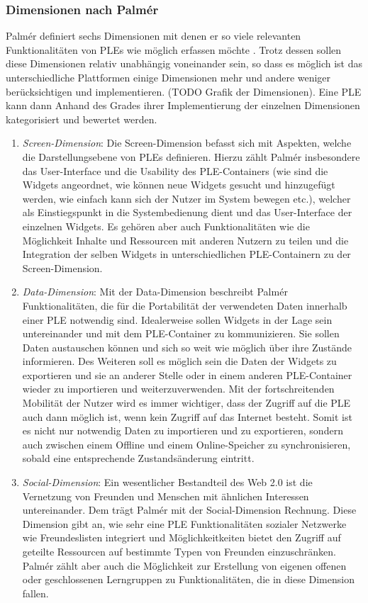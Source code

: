 \subsubsection{Dimensionen nach Palmér}\label{section:dimensions_palmer} 
Palmér definiert sechs Dimensionen mit denen er so viele relevanten Funktionalitäten von PLEs wie möglich erfassen möchte \cite{Palmer2009}. Trotz dessen sollen diese Dimensionen relativ unabhängig voneinander sein, so dass es möglich ist das unterschiedliche Plattformen einige Dimensionen mehr und andere weniger berücksichtigen und implementieren. (TODO Grafik der Dimensionen). Eine PLE kann dann Anhand des Grades ihrer Implementierung der einzelnen Dimensionen kategorisiert und bewertet werden.
\begin{enumerate}
 \item \emph{Screen-Dimension}: Die Screen-Dimension befasst sich mit Aspekten, welche die Darstellungsebene von PLEs definieren. Hierzu zählt Palmér insbesondere das User-Interface und die Usability des PLE-Containers (wie sind die Widgets angeordnet, wie können neue Widgets gesucht und hinzugefügt werden, wie einfach kann sich der Nutzer im System bewegen etc.), welcher als Einstiegspunkt in die Systembedienung dient und das User-Interface der einzelnen Widgets. Es gehören aber auch Funktionalitäten wie die Möglichkeit Inhalte und Ressourcen mit anderen Nutzern zu teilen und die Integration der selben Widgets in unterschiedlichen PLE-Containern zu der Screen-Dimension.
 \item \emph{Data-Dimension}: Mit der Data-Dimension beschreibt Palmér Funktionalitäten, die für die Portabilität der verwendeten Daten innerhalb einer PLE notwendig sind. Idealerweise sollen Widgets in der Lage sein untereinander und mit dem PLE-Container zu kommunizieren. Sie sollen Daten austauschen können und sich so weit wie möglich über ihre Zustände informieren. Des Weiteren soll es möglich sein die Daten der Widgets zu exportieren und sie an anderer Stelle oder in einem anderen PLE-Container wieder zu importieren und weiterzuverwenden. Mit der fortschreitenden Mobilität der Nutzer wird es immer wichtiger, dass der Zugriff auf die PLE auch dann möglich ist, wenn kein Zugriff auf das Internet besteht. Somit ist es nicht nur notwendig Daten zu importieren und zu exportieren, sondern auch zwischen einem Offline und einem Online-Speicher zu synchronisieren, sobald eine entsprechende Zustandsänderung eintritt.
 \item \emph{Social-Dimension}: Ein wesentlicher Bestandteil des Web 2.0 ist die Vernetzung von Freunden und Menschen mit ähnlichen Interessen untereinander. Dem trägt Palmér mit der Social-Dimension Rechnung. Diese Dimension gibt an, wie sehr eine PLE Funktionalitäten sozialer Netzwerke wie Freundeslisten integriert und Möglichkeitkeiten bietet den Zugriff auf geteilte Ressourcen auf bestimmte Typen von Freunden einzuschränken. Palmér zählt aber auch die Möglichkeit zur Erstellung von eigenen offenen oder geschlossenen Lerngruppen zu Funktionalitäten, die in diese Dimension fallen.

\end{enumerate}
